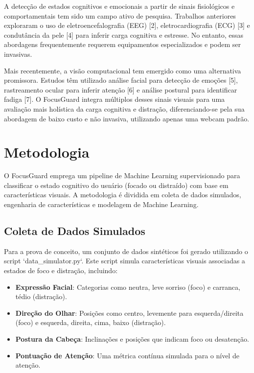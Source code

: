 \documentclass{article}
\begin{document}
A detecção de estados cognitivos e emocionais a partir de sinais fisiológicos e comportamentais tem sido um campo ativo de pesquisa. Trabalhos anteriores exploraram o uso de eletroencefalografia (EEG) [2], eletrocardiografia (ECG) [3] e condutância da pele [4] para inferir carga cognitiva e estresse. No entanto, essas abordagens frequentemente requerem equipamentos especializados e podem ser invasivas.

Mais recentemente, a visão computacional tem emergido como uma alternativa promissora. Estudos têm utilizado análise facial para detecção de emoções [5], rastreamento ocular para inferir atenção [6] e análise postural para identificar fadiga [7]. O FocusGuard integra múltiplos desses sinais visuais para uma avaliação mais holística da carga cognitiva e distração, diferenciando-se pela sua abordagem de baixo custo e não invasiva, utilizando apenas uma webcam padrão.

\section{Metodologia}

O FocusGuard emprega um pipeline de Machine Learning supervisionado para classificar o estado cognitivo do usuário (focado ou distraído) com base em características visuais. A metodologia é dividida em coleta de dados simulados, engenharia de características e modelagem de Machine Learning.

\subsection{Coleta de Dados Simulados}

Para a prova de conceito, um conjunto de dados sintéticos foi gerado utilizando o script `data_simulator.py`. Este script simula características visuais associadas a estados de foco e distração, incluindo:
\begin{itemize}
    \item \textbf{Expressão Facial}: Categorias como neutra, leve sorriso (foco) e carranca, tédio (distração).
    \item \textbf{Direção do Olhar}: Posições como centro, levemente para esquerda/direita (foco) e esquerda, direita, cima, baixo (distração).
    \item \textbf{Postura da Cabeça}: Inclinações e posições que indicam foco ou desatenção.
    \item \textbf{Pontuação de Atenção}: Uma métrica contínua simulada para o nível de atenção.
\end{itemize}
\end{document}
